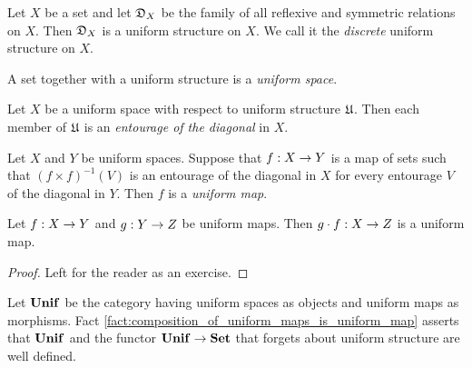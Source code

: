 \documentclass[10pt]{amsart}
\begin{document}
\begin{example}\label{example:discrete_uniform_structure}
	Let $X$ be a set and let ${\mathfrak D}_X$ be the family of all reflexive and symmetric relations on $X$. Then ${\mathfrak D}_X$ is a uniform structure on $X$. We call it the \textit{discrete} uniform structure on $X$.
\end{example}

\begin{definition}
	A set together with a uniform structure is a \textit{uniform space}.
\end{definition}

\begin{definition}
	Let $X$ be a uniform space with respect to uniform structure ${\mathfrak U}$. Then each member of ${\mathfrak U}$ is an \textit{entourage of the diagonal} in $X$.
\end{definition}

\begin{definition}
	Let $X$ and $Y$ be uniform spaces. Suppose that $f:X\rightarrow Y$ is a map of sets such that $\left(f\times f\right)^{-1}(V)$ is an entourage of the diagonal in $X$ for every entourage $V$ of the diagonal in $Y$. Then $f$ is a \textit{uniform map}.
\end{definition}

\begin{fact}\label{fact:composition_of_uniform_maps_is_uniform_map}
	Let $f:X \rightarrow Y$ and $g:Y \rightarrow Z$ be uniform maps. Then $g\cdot f:X\rightarrow Z$ is a uniform map.
\end{fact}
\begin{proof}
	Left for the reader as an exercise.
\end{proof}
\noindent
Let $\mathbf{Unif}$ be the category having uniform spaces as objects and uniform maps as morphisms. Fact \ref{fact:composition_of_uniform_maps_is_uniform_map} asserts that $\mathbf{Unif}$ and the functor $\mathbf{Unif} \rightarrow \mathbf{Set}$ that forgets about uniform structure are well defined.
\end{document}
